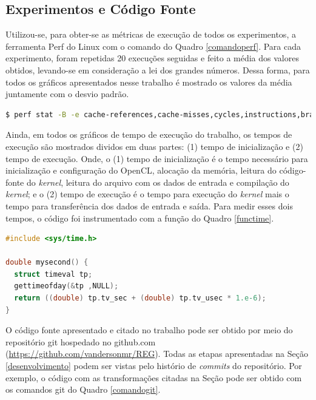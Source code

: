 \documentclass[12pt]{article}
\begin{document}


\subsection{Experimentos  e Código Fonte}

Utilizou-se, para obter-se as métricas de execução de todos os experimentos, a ferramenta Perf do Linux com o comando do Quadro \ref{comandoperf}. Para cada experimento, foram repetidas 20 execuções seguidas e feito a média dos valores obtidos, levando-se em consideração a lei dos grandes números. Dessa forma, para todos os gráficos apresentados nesse trabalho é mostrado os valores da média juntamente com o desvio padrão. \\ %

\begin{lstlisting}[language=bash, caption=Comando para mensurar as métricas de execução., label=comandoperf]
$ perf stat -B -e cache-references,cache-misses,cycles,instructions,branches,branch-misses,faults,migrations
\end{lstlisting}

Ainda, em todos os gráficos de tempo de execução do trabalho, os tempos de execução são mostrados dividos em duas partes: (1) tempo de inicialização e (2) tempo de execução. Onde, o (1) tempo de inicialização é o tempo necessário para inicialização e configuração do OpenCL, alocação da memória, leitura do código-fonte do \textit{kernel}, leitura do arquivo com os dados de entrada e compilação do \textit{kernel}; e o (2) tempo de execução é o tempo para execução do \textit{kernel} mais o tempo para transferência dos dados de entrada e saída. Para medir esses dois tempos, o código foi instrumentado com a função do Quadro \ref{functime}. \\

\begin{lstlisting}[language=c, caption=Função utilizada para calcular o tempo de execução de trexos de código, label=functime]
#include <sys/time.h>

double mysecond() {
  struct timeval tp;
  gettimeofday(&tp ,NULL);
  return ((double) tp.tv_sec + (double) tp.tv_usec * 1.e-6);
}
\end{lstlisting}

O código fonte apresentado e citado no trabalho pode ser obtido por meio do repositório git hospedado no github.com (\url{https://github.com/vandersonmr/REG}). Todas as etapas apresentadas na Seção \ref{desenvolvimento} podem ser vistas pelo histório de \textit{commits} do repositório. Por exemplo, o código com as transformações citadas na Seção \label{desenvolvimento} pode ser obtido com os comandos git do Quadro \ref{comandogit}. \\
\end{document}
